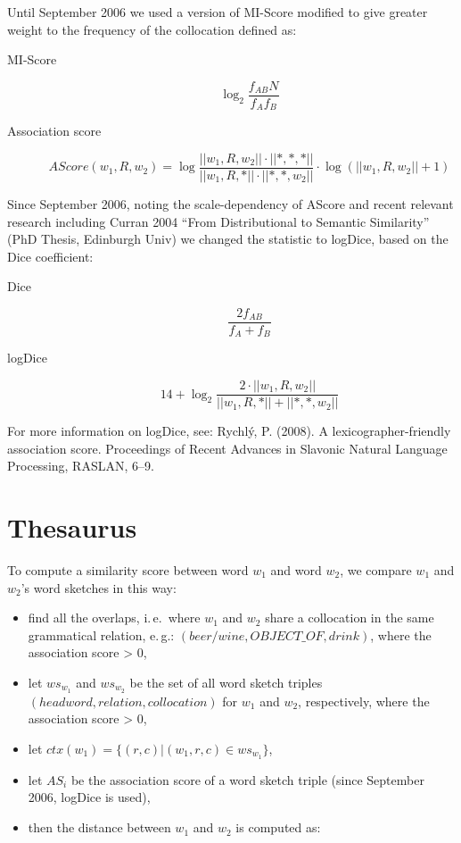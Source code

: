 \documentclass{article}
\begin{document}
Until September 2006 we used a version of MI-Score modified to give greater weight to the frequency of the collocation  defined as:

\begin{description}

\item[MI-Score] $$\log_2 \frac{f_{AB}  N}{f_A  f_B}$$
\item[Association score]  $$AScore(w_1, R, w_2) =  \log \frac{||w_1,R,w_2|| \cdot
  ||*,*,*||}{||w_1,R,*|| \cdot ||*,*,w_2||} \cdot  \log ( ||w_1,R,w_2|| + 1 )$$
\end{description}

Since September 2006, noting the scale-dependency of AScore and recent relevant research including Curran 2004 ``From Distributional to Semantic Similarity'' (PhD Thesis, Edinburgh Univ) we changed the statistic to logDice, based on the Dice coefficient:
\begin{description}

\item[Dice] $$ \frac{2 f_{AB}}{f_A + f_B} $$

\item[logDice]
$$ 14 + \log_2 \frac{2 \cdot ||w_1,R,w_2||}{||w_1,R,*|| + ||*,*,w_2||} $$
\end{description}

For more information on logDice, see: Rychlý, P. (2008). A lexicographer-friendly association score. Proceedings of Recent Advances in Slavonic Natural Language Processing, RASLAN, 6--9.

\section{Thesaurus}

To compute a similarity score between word $w_1$ and word $w_2$, we compare $w_1$ and $w_2$'s word sketches in this way:
\begin{itemize}
  \item find all the overlaps, i.\,e.\ where $w_1$ and $w_2$ share a collocation in the same grammatical relation, e.\,g.: $(beer/wine, OBJECT\_OF, drink)$, where the association score > 0,
  \item let $ws_{w_1}$ and $ws_{w_2}$ be the set of all word sketch triples $(headword, relation, collocation)$ for $w_1$ and $w_2$, respectively, where the association score > 0,
  \item let $ctx(w_1) = \{(r,c) | (w_1,r,c) \in ws_{w_1}\}$,
  \item let $AS_i$ be the association score of a word sketch triple (since September 2006, logDice is used),
  \item then the distance between $w_1$ and $w_2$ is computed as:
\end{itemize}
\end{document}
